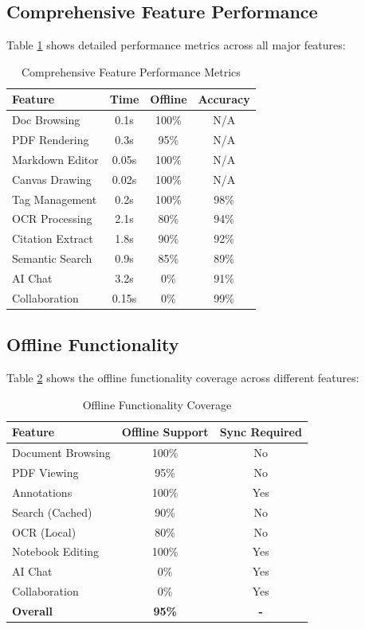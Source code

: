\documentclass[conference]{IEEEtran}
\begin{document}
\subsection{Comprehensive Feature Performance}

Table \ref{tab:feature_performance} shows detailed performance metrics across all major features:

\begin{table}[htbp]
\caption{Comprehensive Feature Performance Metrics}
\begin{center}
\begin{tabular}{|l|c|c|c|}
\hline
\textbf{Feature} & \textbf{Time} & \textbf{Offline} & \textbf{Accuracy} \\
\hline
Doc Browsing & 0.1s & 100\% & N/A \\
PDF Rendering & 0.3s & 95\% & N/A \\
Markdown Editor & 0.05s & 100\% & N/A \\
Canvas Drawing & 0.02s & 100\% & N/A \\
Tag Management & 0.2s & 100\% & 98\% \\
OCR Processing & 2.1s & 80\% & 94\% \\
Citation Extract & 1.8s & 90\% & 92\% \\
Semantic Search & 0.9s & 85\% & 89\% \\
AI Chat & 3.2s & 0\% & 91\% \\
Collaboration & 0.15s & 0\% & 99\% \\
\hline
\end{tabular}
\end{center}
\label{tab:feature_performance}
\end{table}

\subsection{Offline Functionality}

Table \ref{tab:offline} shows the offline functionality coverage across different features:

\begin{table}[htbp]
\caption{Offline Functionality Coverage}
\begin{center}
\begin{tabular}{|l|c|c|}
\hline
\textbf{Feature} & \textbf{Offline Support} & \textbf{Sync Required} \\
\hline
Document Browsing & 100\% & No \\
PDF Viewing & 95\% & No \\
Annotations & 100\% & Yes \\
Search (Cached) & 90\% & No \\
OCR (Local) & 80\% & No \\
Notebook Editing & 100\% & Yes \\
AI Chat & 0\% & Yes \\
Collaboration & 0\% & Yes \\
\hline
\textbf{Overall} & \textbf{95\%} & \textbf{-} \\
\hline
\end{tabular}
\end{center}
\label{tab:offline}
\end{table}
\end{document}

